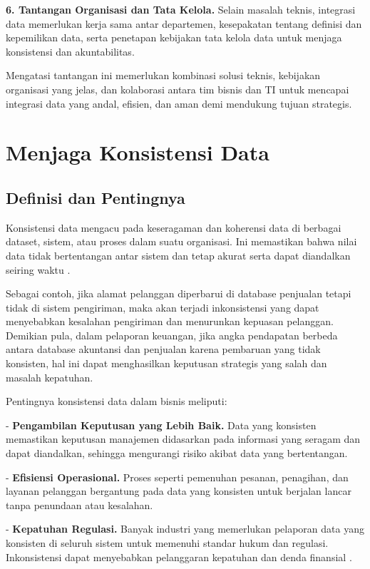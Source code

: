 \textbf{6. Tantangan Organisasi dan Tata Kelola.}  
Selain masalah teknis, integrasi data memerlukan kerja sama antar departemen, kesepakatan tentang definisi dan kepemilikan data, serta penetapan kebijakan tata kelola data untuk menjaga konsistensi dan akuntabilitas.

Mengatasi tantangan ini memerlukan kombinasi solusi teknis, kebijakan organisasi yang jelas, dan kolaborasi antara tim bisnis dan TI untuk mencapai integrasi data yang andal, efisien, dan aman demi mendukung tujuan strategis.

\section{Menjaga Konsistensi Data}

\subsection{Definisi dan Pentingnya}

Konsistensi data mengacu pada keseragaman dan koherensi data di berbagai dataset, sistem, atau proses dalam suatu organisasi. Ini memastikan bahwa nilai data tidak bertentangan antar sistem dan tetap akurat serta dapat diandalkan seiring waktu \cite{chen2012data}.

Sebagai contoh, jika alamat pelanggan diperbarui di database penjualan tetapi tidak di sistem pengiriman, maka akan terjadi inkonsistensi yang dapat menyebabkan kesalahan pengiriman dan menurunkan kepuasan pelanggan. Demikian pula, dalam pelaporan keuangan, jika angka pendapatan berbeda antara database akuntansi dan penjualan karena pembaruan yang tidak konsisten, hal ini dapat menghasilkan keputusan strategis yang salah dan masalah kepatuhan.

Pentingnya konsistensi data dalam bisnis meliputi:

- \textbf{Pengambilan Keputusan yang Lebih Baik.} Data yang konsisten memastikan keputusan manajemen didasarkan pada informasi yang seragam dan dapat diandalkan, sehingga mengurangi risiko akibat data yang bertentangan.

- \textbf{Efisiensi Operasional.} Proses seperti pemenuhan pesanan, penagihan, dan layanan pelanggan bergantung pada data yang konsisten untuk berjalan lancar tanpa penundaan atau kesalahan.

- \textbf{Kepatuhan Regulasi.} Banyak industri yang memerlukan pelaporan data yang konsisten di seluruh sistem untuk memenuhi standar hukum dan regulasi. Inkonsistensi dapat menyebabkan pelanggaran kepatuhan dan denda finansial \cite{rahm2000dataquality}.

